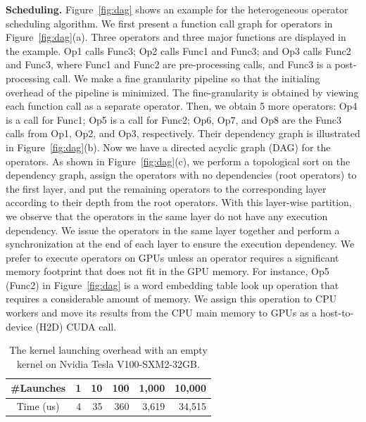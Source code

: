 \documentclass[sigconf]{acmart}
\begin{document}
\textbf{Scheduling.} 
Figure~\ref{fig:dag} shows an example for the heterogeneous operator scheduling algorithm. We first present a function call graph for operators in Figure~\ref{fig:dag}(a). 
Three operators and three major functions are displayed in the example. 
Op1 calls Func3; Op2 calls Func1 and Func3; and Op3 calls Func2 and Func3, where Func1 and Func2 are pre-processing calls, and Func3 is a post-processing call. We make a fine granularity pipeline so that the initialing overhead of the pipeline is minimized. The fine-granularity is obtained by viewing each function call as a separate operator. Then, we obtain 5 more operators: Op4 is a call for Func1; Op5 is a call for Func2; Op6, Op7, and Op8 are the Func3 calls from Op1, Op2, and Op3, respectively. Their dependency graph is illustrated in Figure~\ref{fig:dag}(b). Now we have a directed acyclic graph (DAG) for the operators. As shown in Figure~\ref{fig:dag}(c), we perform a topological sort on the dependency graph, assign the operators with no dependencies (root operators) to the first layer, and put the remaining operators to the corresponding layer according to their depth from the root operators. With this layer-wise partition, we observe that the operators in the same layer do not have any execution dependency. We issue the operators in the same layer together and perform a synchronization at the end of each layer to ensure the execution dependency. We prefer to execute operators on GPUs unless an operator requires a significant memory footprint that does not fit in the GPU memory. 
For instance, Op5 (Func2) in Figure~\ref{fig:dag} is a word embedding table look up operation that requires a considerable amount of memory. We assign this operation to CPU workers and move its results from the CPU main memory to GPUs as a host-to-device (H2D) CUDA call.


\begin{table}[htbp]
\caption{The kernel launching overhead with an empty kernel on Nvidia Tesla V100-SXM2-32GB.}
\label{tbl:launch}
\centering
\normalsize
\begin{tabular}{c|rrrrr}
\toprule
\hline
\#Launches & 1 & 10 & 100 & 1,000 & 10,000 \\
\hline
Time (us) & 4 & 35 & 360 & 3,619 & 34,515\\
\hline
\bottomrule
\end{tabular}
\end{table}
\end{document}

